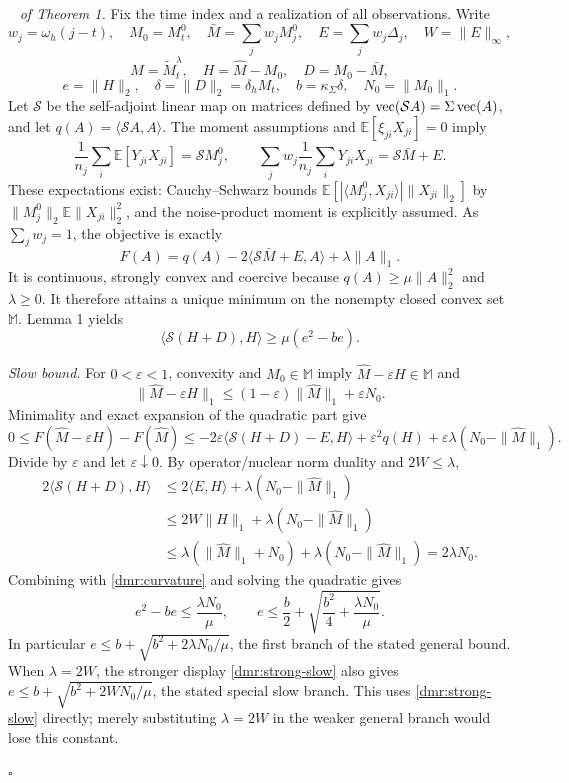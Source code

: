 \documentclass[12pt]{article}
\newcommand{\myvec}[1]%
{\stackrel{\raisebox{-2pt}[0pt][0pt]{\tiny$\rightharpoonup$}}{#1}}
\def\myvec{\mathop{\rm vec}}
\newenvironment{pf}{{\noindent\it Proof}\ }{\hfill $\square$\par}
\begin{document}
\begin{pf}
\textit{of Theorem 1.}
Fix the time index and a realization of all observations. Write
\[
 w_j=\omega_h(j-t),\quad M_0=M_t^0,\quad
 \bar M=\sum_jw_jM_j^0,\quad
 E=\sum_jw_j\Delta_j,\quad W=\|E\|_\infty,
\]
\[
 \widehat M=\widetilde M_t^\lambda,\quad
 H=\widehat M-M_0,\quad D=M_0-\bar M,
\]
\[
 e=\|H\|_2,\quad\delta=\|D\|_2=\delta_hM_t,\quad
 b=\kappa_\Sigma\delta,\quad N_0=\|M_0\|_1.
\]
Let $\mathcal S$ be the self-adjoint linear map on matrices defined by
$\myvec(\mathcal S A)=\Sigma\myvec(A)$, and let
$q(A)=\langle\mathcal S A,A\rangle$. The moment assumptions and
$\mathbb E[\xi_{ji}X_{ji}]=0$ imply
\[
 \frac1{n_j}\sum_i\mathbb E[Y_{ji}X_{ji}]=\mathcal S M_j^0,
 \qquad
 \sum_j w_j\frac1{n_j}\sum_iY_{ji}X_{ji}=\mathcal S\bar M+E.
\]
These expectations exist: Cauchy--Schwarz bounds
$\mathbb E[|\langle M_j^0,X_{ji}\rangle|\|X_{ji}\|_2]$
by $\|M_j^0\|_2\mathbb E\|X_{ji}\|_2^2$, and the noise-product
moment is explicitly assumed. As $\sum_jw_j=1$, the objective is exactly
\[
 F(A)=q(A)-2\langle\mathcal S\bar M+E,A\rangle+\lambda\|A\|_1.
\]
It is continuous, strongly convex and coercive because
$q(A)\ge\mu\|A\|_2^2$ and $\lambda\ge0$.
It therefore attains a unique minimum on the nonempty closed convex
set $\mathbb M$. Lemma 1 yields
\begin{equation}\label{dmr:curvature}
 \langle\mathcal S(H+D),H\rangle
 \ge\mu(e^2-be).
\end{equation}

\noindent\textit{Slow bound.}
For $0<\varepsilon<1$, convexity and $M_0\in\mathbb M$ imply
$\widehat M-\varepsilon H\in\mathbb M$ and
\[
 \|\widehat M-\varepsilon H\|_1
 \le(1-\varepsilon)\|\widehat M\|_1+\varepsilon N_0.
\]
Minimality and exact expansion of the quadratic part give
\[
 0\le F(\widehat M-\varepsilon H)-F(\widehat M)
 \le-2\varepsilon\langle\mathcal S(H+D)-E,H\rangle
       +\varepsilon^2q(H)
       +\varepsilon\lambda(N_0-\|\widehat M\|_1).
\]
Divide by $\varepsilon$ and let $\varepsilon\downarrow0$. By
operator/nuclear norm duality and $2W\le\lambda$,
\begin{align*}
 2\langle\mathcal S(H+D),H\rangle
 &\le2\langle E,H\rangle+\lambda(N_0-\|\widehat M\|_1)\\
 &\le2W\|H\|_1+\lambda(N_0-\|\widehat M\|_1)\\
 &\le\lambda(\|\widehat M\|_1+N_0)
       +\lambda(N_0-\|\widehat M\|_1)=2\lambda N_0.
\end{align*}
Combining with \eqref{dmr:curvature} and solving the quadratic gives
\begin{equation}\label{dmr:strong-slow}
 e^2-be\le\frac{\lambda N_0}{\mu},\qquad
 e\le\frac b2+\sqrt{\frac{b^2}{4}+\frac{\lambda N_0}{\mu}}.
\end{equation}
In particular
$e\le b+\sqrt{b^2+2\lambda N_0/\mu}$, the first branch of the
stated general bound. When $\lambda=2W$, the stronger display
\eqref{dmr:strong-slow} also gives
$e\le b+\sqrt{b^2+2WN_0/\mu}$, the stated special slow branch.
This uses \eqref{dmr:strong-slow} directly; merely substituting
$\lambda=2W$ in the weaker general branch would lose this constant.


\end{pf}
\end{document}
